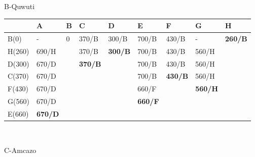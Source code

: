 \documentclass[12pt]{article}
\begin{document}
\begin{enumerate}
\begin{center}
            B-Quwuti
            
\begin{tabular}{|l|l|lllllll}
\hline
 & A & \multicolumn{1}{l|}{B} & \multicolumn{1}{l|}{C} & \multicolumn{1}{l|}{D} & \multicolumn{1}{l|}{E} & \multicolumn{1}{l|}{F} & \multicolumn{1}{l|}{G} & \multicolumn{1}{l|}{H} \\ \hline
B(0) & - & \multicolumn{1}{l|}{0} & \multicolumn{1}{l|}{370/B} & \multicolumn{1}{l|}{300/B} & \multicolumn{1}{l|}{700/B} & \multicolumn{1}{l|}{430/B} & \multicolumn{1}{l|}{-} & \multicolumn{1}{l|}{\textbf{260/B}} \\ \hline
H(260) & 690/H & \multicolumn{1}{l|}{} & \multicolumn{1}{l|}{370/B} & \multicolumn{1}{l|}{\textbf{300/B}} & \multicolumn{1}{l|}{700/B} & \multicolumn{1}{l|}{430/B} & \multicolumn{1}{l|}{560/H} &  \\ \cline{1-2} \cline{4-8}
D(300) & 670/D & \multicolumn{1}{l|}{} & \multicolumn{1}{l|}{\textbf{370/B}} & \multicolumn{1}{l|}{} & \multicolumn{1}{l|}{700/B} & \multicolumn{1}{l|}{430/B} & \multicolumn{1}{l|}{560/H} &  \\ \cline{1-2} \cline{4-4} \cline{6-8}
C(370) & 670/D &  &  & \multicolumn{1}{l|}{} & \multicolumn{1}{l|}{700/B} & \multicolumn{1}{l|}{\textbf{430/B}} & \multicolumn{1}{l|}{560/H} &  \\ \cline{1-2} \cline{6-8}
F(430) & 670/D &  &  & \multicolumn{1}{l|}{} & \multicolumn{1}{l|}{660/F} & \multicolumn{1}{l|}{} & \multicolumn{1}{l|}{\textbf{560/H}} &  \\ \cline{1-2} \cline{6-6} \cline{8-8}
G(560) & 670/D &  &  & \multicolumn{1}{l|}{} & \multicolumn{1}{l|}{\textbf{660/F}} &  &  &  \\ \cline{1-2} \cline{6-6}
E(660) & \textbf{670/D} &  &  &  &  & \textbf{} &  &  \\ \cline{1-2}
\end{tabular}
\\
      \vspace{0.5cm}
      
              C-Amcazo
              

\end{center}
\end{enumerate}
\end{document}
